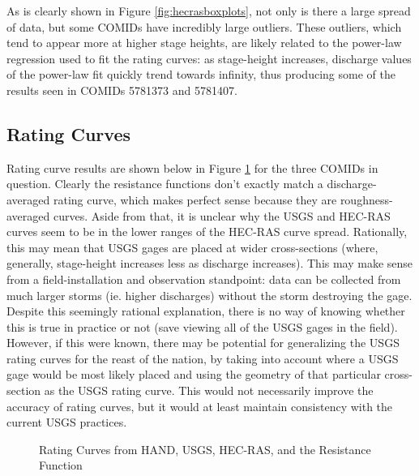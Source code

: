 \documentclass[12pt]{article}
\begin{document}
As is clearly shown in Figure \ref{fig:hecrasboxplots}, not only is there a large spread of data, but some COMIDs have incredibly large outliers. These outliers, which tend to appear more at higher stage heights, are likely related to the power-law regression used to fit the rating curves: as stage-height increases, discharge values of the power-law fit quickly trend towards infinity, thus producing some of the results seen in COMIDs 5781373 and 5781407.  

\subsection*{Rating Curves}

Rating curve results are shown below in Figure \ref{fig:ratingcurves} for the three COMIDs in question. Clearly the resistance functions don't exactly match a discharge-averaged rating curve, which makes perfect sense because they are roughness-averaged curves. Aside from that, it is unclear why the USGS and HEC-RAS curves seem to be in the lower ranges of the HEC-RAS curve spread. Rationally, this may mean that USGS gages are placed at wider cross-sections (where, generally, stage-height increases less as discharge increases). This may make sense from a field-installation and observation standpoint: data can be collected from much larger storms (ie. higher discharges) without the storm destroying the gage. Despite this seemingly rational explanation, there is no way of knowing whether this is true in practice or not (save viewing all of the USGS gages in the field). However, if this were known, there may be potential for generalizing the USGS rating curves for the reast of the nation, by taking into account where a USGS gage would be most likely placed and using the geometry of that particular cross-section as the USGS rating curve. This would not necessarily improve the accuracy of rating curves, but it would at least maintain consistency with the current USGS practices. 

\begin{figure}[h!]
\caption{Rating Curves from HAND, USGS, HEC-RAS, and the Resistance Function} \label{fig:ratingcurves}
\end{figure}
\end{document}
